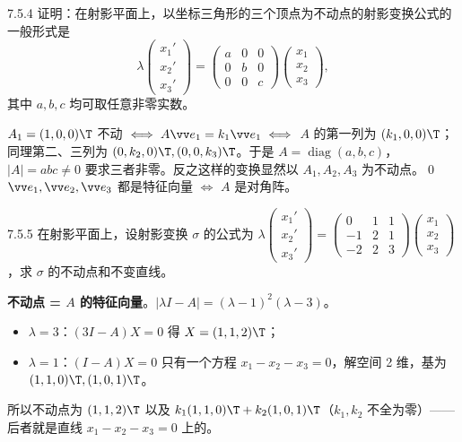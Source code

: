 \begin{ex}{7.5.4}
证明：在射影平面上，以坐标三角形的三个顶点为不动点的射影变换公式的一般形式是
\[
\lambda\begin{pmatrix}x_1'\\x_2'\\x_3'\end{pmatrix}=\begin{pmatrix}a&0&0\\0&b&0\\0&0&c\end{pmatrix}\begin{pmatrix}x_1\\x_2\\x_3\end{pmatrix},
\]
其中 $a,b,c$ 均可取任意非零实数。
\end{ex}
\zheng $A_1=(1,0,0)\T$ 不动 $\iff A\vv e_1=k_1\vv e_1\iff$ $A$ 的第一列为 $(k_1,0,0)\T$；同理第二、三列为 $(0,k_2,0)\T,(0,0,k_3)\T$。于是 $A=\operatorname{diag}(a,b,c)$，$|A|=abc\neq0$ 要求三者非零。反之这样的变换显然以 $A_1,A_2,A_3$ 为不动点。\qed\quad\gd $\vv e_1,\vv e_2,\vv e_3$ 都是特征向量 $\iff$ $A$ 是对角阵。

\begin{ex}{7.5.5}
在射影平面上，设射影变换 $\sigma$ 的公式为
$\lambda\begin{pmatrix}x_1'\\x_2'\\x_3'\end{pmatrix}=\begin{pmatrix}0&1&1\\-1&2&1\\-2&2&3\end{pmatrix}\begin{pmatrix}x_1\\x_2\\x_3\end{pmatrix}$，求 $\sigma$ 的不动点和不变直线。
\end{ex}
\jie\textbf{不动点 = $A$ 的特征向量}。$|\lambda I-A|=(\lambda-1)^2(\lambda-3)$。
\begin{itemize}
\item $\lambda=3$：$(3I-A)X=0$ 得 $X=(1,1,2)\T$；
\item $\lambda=1$：$(I-A)X=0$ 只有一个方程 $x_1-x_2-x_3=0$，解空间 2 维，基为 $(1,1,0)\T,(1,0,1)\T$。
\end{itemize}
所以不动点为 $(1,1,2)\T$ 以及 $k_1(1,1,0)\T+k_2(1,0,1)\T$（$k_1,k_2$ 不全为零）——后者就是直线 $x_1-x_2-x_3=0$ 上的。

